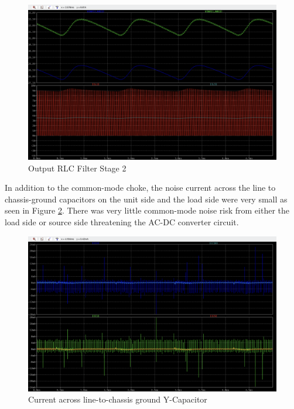 \documentclass[conference]{IEEEtran}
\begin{document}
\begin{figure}[htp]
    \centering
    \includegraphics[width=1.0\linewidth]{output_filter_rlc_stage_2.png}
    \caption{Output RLC Filter Stage 2}
    \label{fig:output_filter_rlc_stage_2_waveforms}
\end{figure}

In addition to the common-mode choke, the noise current across the line to chassis-ground capacitors on the unit side and the load side were very small as seen in Figure \ref{fig:output_filter_chassis_ground_y_capacitors_waveforms}. There was very little common-mode noise risk from either the load side or source side threatening the AC-DC converter circuit.  

\begin{figure}[htp]
    \centering
    \includegraphics[width=1.0\linewidth]{output_filter_chassis_ground_y_capacitors.png}
    \caption{Current across line-to-chassis ground Y-Capacitor}
    \label{fig:output_filter_chassis_ground_y_capacitors_waveforms}
\end{figure}
\end{document}
